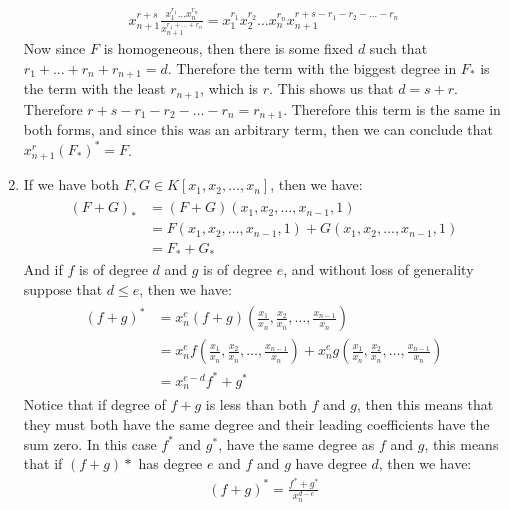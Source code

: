 \begin{enumerate}[label=\ilabel]
        \begin{gather*}
            x_{n + 1}^{r + s} \frac{x_1^{r_1} \dots x_n^{r_n}}{x_{n + 1}^{r_1 + \dots + r_n}} = x_1^{r_1} x_2^{r_2} \dots x_n^{r_n} x_{n + 1}^{r + s - r_1 - r_2 - \dots - r_n}
        \end{gather*}
        Now since $F$ is homogeneous, then there is some fixed $d$ such that $r_1 + \dots + r_n + r_{n + 1} = d$. Therefore the term with the biggest degree in $F_*$ is the term with the least $r_{n + 1}$, which is $r$. This shows us that $d = s + r$. Therefore $r + s - r_1 - r_2 - \dots - r_n = r_{n + 1}$. Therefore this term is the same in both forms, and since this was an arbitrary term, then we can conclude that $x_{n + 1}^{r} (F_*)^* = F$.
    \item 
        If we have both $F, G \in K[x_1, x_2, \dots, x_n]$, then we have:
        \begin{gather*}
            \begin{split}
                (F + G)_* & = (F + G)(x_1, x_2, \dots, x_{n - 1}, 1) \\
                & = F(x_1, x_2, \dots, x_{n - 1}, 1) + G(x_1, x_2, \dots, x_{n - 1}, 1)\\
                & = F_* + G_*
            \end{split}
        \end{gather*}
        And if $f$ is of degree $d$ and $g$ is of degree $e$, and without loss of generality suppose that $d \le e$, then we have:
        \begin{gather*}
            \begin{split}
                (f + g)^* & = x_n^e (f + g)(\frac{x_1}{x_n}, \frac{x_2}{x_n}, \dots, \frac{x_{n - 1}}{x_n}) \\
                & = x_n^e f(\frac{x_1}{x_n}, \frac{x_2}{x_n}, \dots, \frac{x_{n - 1}}{x_n}) + x_n^e g(\frac{x_1}{x_n}, \frac{x_2}{x_n}, \dots, \frac{x_{n - 1}}{x_n}) \\
                & = x_n^{e - d} f^* + g^*
            \end{split}
        \end{gather*}
        Notice that if degree of $f + g$ is less than both $f$ and $g$, then this means that they must both have the same degree and their leading coefficients have the sum zero. In this case $f^*$ and $g^*$, have the same degree as $f$ and $g$, this means that if $(f + g)*$ has degree $e$ and $f$ and $g$ have degree $d$, then we have:
        \begin{gather*}
            (f + g)^* = \frac{f^* + g^*}{x_n^{d - e}}
        \end{gather*}
\end{enumerate}